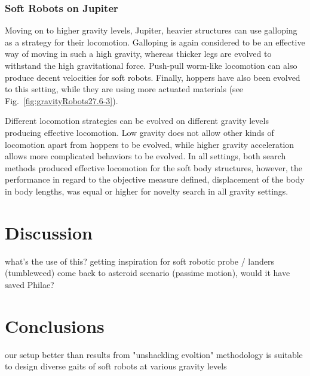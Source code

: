 \documentclass{sig-alternate}
\begin{document}
\subsubsection*{Soft Robots on Jupiter}

Moving on to higher gravity levels, Jupiter, heavier structures can use galloping as a strategy for their locomotion. Galloping is again considered to be an effective way of moving in such a high gravity, whereas thicker legs are evolved to withstand the high gravitational force. Push-pull worm-like locomotion can also produce decent velocities for soft robots. Finally, hoppers have also been evolved to this setting, while they are using more actuated materials (see Fig.~\ref{fig:gravityRobots27.6-3}).


Different locomotion strategies can be evolved on different gravity levels producing effective locomotion. Low gravity does not allow other kinds of locomotion apart from hoppers to be evolved, while higher gravity acceleration allows more complicated behaviors to be evolved. In all settings, both search methods produced effective locomotion for the soft body structures, however, the performance in regard to the objective measure defined, displacement of the body in body lengths, was equal or higher for novelty search in all gravity settings.



\section{Discussion}
what's the use of this?
getting inspiration for soft robotic probe / landers (tumbleweed)
come back to asteroid scenario (passime motion), would it have saved Philae?


\section{Conclusions}
our setup better than results from "unshackling evoltion"
methodology is suitable to design diverse gaits of soft robots at various gravity levels
\end{document}
